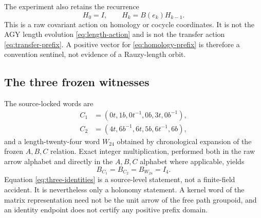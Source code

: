 The experiment also retains the recurrence
\begin{equation}
 H_0=I,\qquad H_k=B(e_k)H_{k-1}.
 \label{eq:homology-prefix}
\end{equation}
This is a raw covariant action on homology or cocycle coordinates.  It is not
the AGY length evolution \eqref{eq:length-action} and is not the transfer
action \eqref{eq:transfer-prefix}.  A positive vector for
\eqref{eq:homology-prefix} is therefore a convention sentinel, not evidence
of a Rauzy-length orbit.

\subsection{The three frozen witnesses}

The source-locked words are
\begin{align}
C_1&=(0t,1b,0t^{-1},0b,3t,0b^{-1}),
\label{eq:C1}\\
C_2&=(4t,6b^{-1},6t,5b,6t^{-1},6b),
\label{eq:C2}
\end{align}
and a length-twenty-four word $W_{24}$ obtained by chronological expansion of
the frozen $A,B,C$ relation.  Exact integer multiplication, performed both in
the raw arrow alphabet and directly in the $A,B,C$ alphabet where applicable,
yields
\begin{equation}
 B_{C_1}=B_{C_2}=B_{W_{24}}=I_4.
 \label{eq:three-identities}
\end{equation}
Equation \eqref{eq:three-identities} is a source-level statement, not a
finite-field accident.  It is nevertheless only a holonomy statement.  A
kernel word of the matrix representation need not be the unit arrow of the
free path groupoid, and an identity endpoint does not certify any positive
prefix domain.

